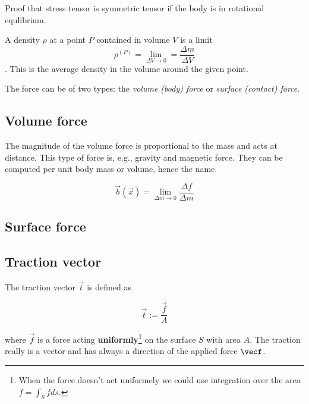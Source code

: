 \begin{equation}
\end{equation}
    
Proof that stress tensor is symmetric tensor if the body is in rotational equlibrium.


A density $\rho$ at a point $P$ contained in volume $V$ is a limit
$$
    \rho^{(P)} = \lim_{\Delta V \to 0} = \frac{\Delta m}{\Delta V} 
$$. This is the average density in the volume around the given point.     


The force can be of two types: the \textit{volume (body) force} or \textit{surface (contact) force}.

\subsection{Volume force}

The magnitude of the volume force is proportional to the mass and acts at distance. This type of force is, e.g., gravity and magnetic force. They can be computed per unit body mass or volume, hence the name.

\begin{equation}
    \vec b (\vec x) = \lim_{\Delta m \to 0} \frac{\Delta f}{\Delta m}
\end{equation}

\subsection{Surface force}

\subsection{Traction vector}

The traction vector $\vec t$ is defined as

\begin{equation} \label{eq:traction_vector.1}
    \vec{t} := \frac{\vec f}{A}
\end{equation}

where $\vec f$ is a force acting \textbf{\textbf{uniformly}}\footnote{When  the force doesn't act uniformely we could use integration over the area $ f = \int_S f ds $.} on the surface $S$ with area $A$. The traction really is a vector and has always a direction of the applied force $\vecf$.  

